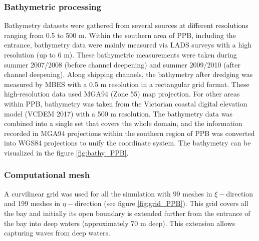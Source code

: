 \documentclass[12pt]{article}
\begin{document}
\subsubsection{Bathymetric processing}

Bathymetry datasets were gathered from several sources at different resolutions ranging from 0.5 to 500 m. Within the southern area of PPB, including the entrance, bathymetry data were mainly measured via LADS surveys with a high resolution (up to 6 m). These bathymetric measurements were taken during summer 2007/2008 (before channel deepening) and summer 2009/2010 (after channel deepening). Along shipping channels, the bathymetry after dredging was measured by MBES with a 0.5 m resolution in a rectangular grid format. These high-resolution data used MGA94 (Zone 55) map projection. For other areas within PPB, bathymetry was taken from the Victorian coastal digital elevation model (VCDEM 2017) with a 500 m resolution. The bathymetry data was combined into a single set that covers the whole domain, and the information recorded in MGA94 projections within the southern region of PPB was converted into WGS84 projections to unify the coordinate system. The bathymetry can be visualized in the figure \ref{fig:bathy_PPB}.

\subsubsection{Computational mesh}

A curvilinear grid was used for all the simulation with 99 meshes in $\xi-$direction and 199 meshes in $\eta-$direction (see figure \ref{fig:grid_PPB}). This grid covers all the bay and initially its open boundary is extended further from the entrance of the bay into deep waters (approximately 70 m deep). This extension allows capturing waves from deep waters.
\end{document}
